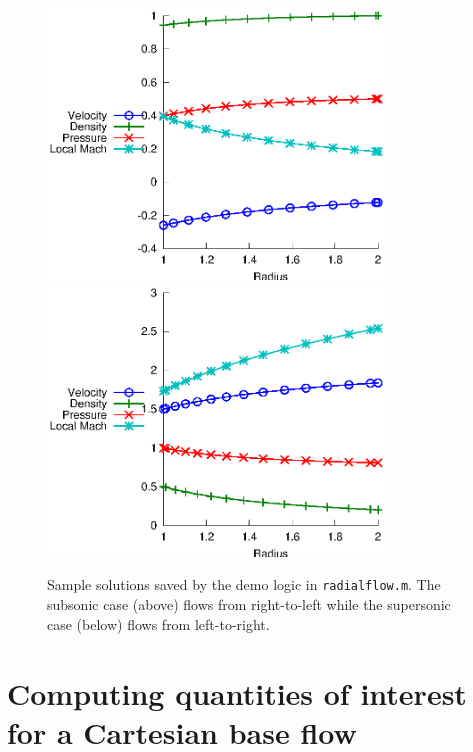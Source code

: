 \documentclass[letterpaper,11pt,nointlimits,reqno]{amsart}
\begin{document}
\begin{figure}[p]
  \centering
  \includegraphics[width=0.80\textwidth]{nozzle_subsonic}
  \vfill
  \includegraphics[width=0.80\textwidth]{nozzle_supersonic}
  \caption{
      \label{fig:sample_solns}
      Sample solutions saved by the demo logic in \texttt{radialflow.m}.  The
      subsonic case (above) flows from right-to-left while the supersonic case
      (below) flows from left-to-right.
  }
\end{figure}

\clearpage

\section{Computing quantities of interest for a Cartesian base flow}
\end{document}
